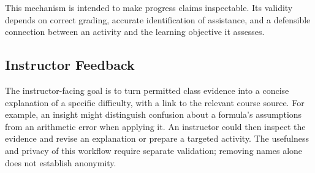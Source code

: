 This mechanism is intended to make progress claims inspectable.
Its validity depends on correct grading, accurate identification of
assistance, and a defensible connection between an activity and the
learning objective it assesses.

\subsection{Instructor Feedback}

The instructor-facing goal is to turn permitted class evidence into a
concise explanation of a specific difficulty, with a link to the relevant
course source. For example, an insight might distinguish confusion about
a formula's assumptions from an arithmetic error when applying it.
An instructor could then inspect the evidence and revise an explanation
or prepare a targeted activity. The usefulness and privacy of this
workflow require separate validation; removing names alone does not
establish anonymity.
